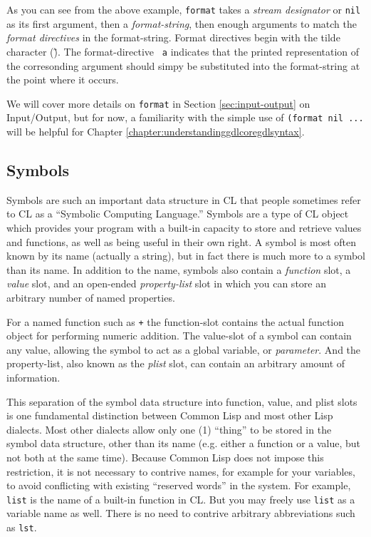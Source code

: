 \documentclass [11pt]{book}
\begin{document}
As you can see from the above example, \texttt{format} takes a \emph{stream designator} or \texttt{nil} as its first argument, then a \emph{format-string}, then enough arguments to match the \emph{format directives} in the format-string. Format directives begin with the
tilde character (\~).  The format-directive \texttt{~a} indicates that the printed representation of the corresonding argument should simpy be 
substituted into the format-string at the point where it occurs.



We will cover more details on \texttt{format} in Section 
\ref{sec:input-output} on Input/Output, but for now, a familiarity with the simple use of \texttt{(format nil ...} will be helpful for Chapter 
\ref{chapter:understandinggdlcoregdlsyntax}.



\subsection{Symbols}

\label{subsec:symbols}



Symbols are such an important data structure in CL that people
sometimes refer to CL as a ``Symbolic Computing Language.'' Symbols
are a type of CL object which provides your program with a built-in
capacity to store and retrieve values and functions, as well as being
useful in their own right. A symbol is most often known by its name
 (actually a string), but in fact there is much more to a symbol than
its name. In addition to the name, symbols also contain a \emph{function} slot, a \emph{value} slot, and an open-ended \emph{property-list} slot in which you can store an arbitrary number of named properties.



For a named function such as \texttt{+} the function-slot contains the actual function
object for performing numeric addition. The value-slot of a symbol can
contain any value, allowing the symbol to act as a global variable, or \emph{parameter}. And the property-list, also known as the \emph{plist} slot, can contain an arbitrary amount of information.



This separation of the symbol data structure into function, value, and
plist slots is one fundamental distinction between Common Lisp and most
other Lisp dialects. Most other dialects allow only one (1) ``thing''
to be stored in the symbol data structure, other than its name
 (e.g. either a function or a value, but not both at the same
time). Because Common Lisp does not impose this restriction, it is not
necessary to contrive names, for example for your variables, to avoid
conflicting with existing ``reserved words'' in the system. For
example, \texttt{list} is the name of a built-in function in CL. But you
may freely use \texttt{list} as a variable name as well. There is no need to
contrive arbitrary abbreviations such as \texttt{lst}.
\end{document}
